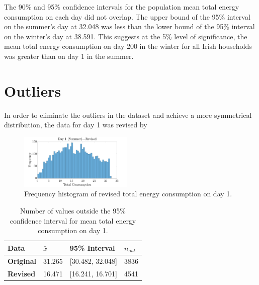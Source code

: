 \documentclass[a4paper,10pt]{article}
\begin{document}
The 90\% and 95\% confidence intervals for the population mean total energy 
consumption on each day did not overlap. The upper bound of the 95\% interval 
on the summer's day at 32.048 was less than the lower bound of the 95\% 
interval on the winter's day at 38.591. This suggests at the 5\% level of 
significance, the mean total energy consumption on day 200 in the winter for 
all Irish households was greater than on day 1 in the summer.

\section{Outliers}

In order to eliminate the outliers in the dataset and achieve a more 
symmetrical distribution, the data for day 1 was revised by 

\begin{figure}[h]
    \centering
    \includegraphics[width=0.48\textwidth]{Day1Revised}
    \caption{Frequency histogram of revised total energy consumption on day 1.}
    \label{fig:NoOutliers}
\end{figure}

\begin{table}[h]
    \centering
    \begin{tabular}{llll}
        \toprule
        \textbf{Data} & $\bar{x}$ & 95\% Interval & $n_{out}$ \\
        \midrule
        \textbf{Original} & 31.265 & [30.482, 32.048] & 3836 \\
        \textbf{Revised}  & 16.471 & [16.241, 16.701] & 4541 \\
        \bottomrule
    \end{tabular}
    \caption{Number of values outside the 95\% confidence interval for mean 
    total energy consumption on day 1.}
    \label{table:Outliers}
\end{table}

\printbibliography

\clearpage
\end{document}
